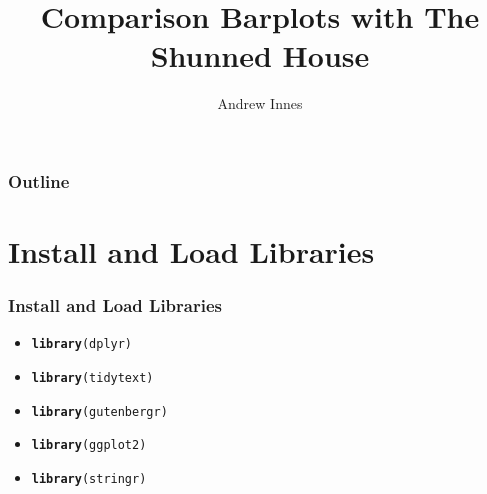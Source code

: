 \documentclass{beamer}\usepackage[]{graphicx}\usepackage[]{color}
\makeatletter
\newcommand{\hlstd}[1]{\textcolor[rgb]{0.345,0.345,0.345}{#1}}%
\newcommand{\hlkwd}[1]{\textcolor[rgb]{0.737,0.353,0.396}{\textbf{#1}}}%
\newenvironment{kframe}{%
 \def\at@end@of@kframe{}%
 \ifinner\ifhmode%
  \def\at@end@of@kframe{\end{minipage}}%
  \begin{minipage}{\columnwidth}%
 \fi\fi%
 \def\FrameCommand##1{\hskip\@totalleftmargin \hskip-\fboxsep
 \colorbox{shadecolor}{##1}\hskip-\fboxsep
     \hskip-\linewidth \hskip-\@totalleftmargin \hskip\columnwidth}%
 \MakeFramed {\advance\hsize-\width
   \@totalleftmargin\z@ \linewidth\hsize
   \@setminipage}}%
 {\par\unskip\endMakeFramed%
 \at@end@of@kframe}
\newenvironment{knitrout}{}{} %
\makeatother
\begin{document}
\title{Comparison Barplots with The Shunned House}
\author{Andrew Innes}

\begin{frame}
  \titlepage
\end{frame}

\begin{frame}
  \frametitle{Outline}
    \tableofcontents
\end{frame}

\section{Install and Load Libraries}
\begin{frame}[fragile]
  \frametitle{Install and Load Libraries}
    \begin{itemize}
      \item<1->
\begin{knitrout}
\color{fgcolor}\begin{kframe}
\begin{alltt}
\hlkwd{library}\hlstd{(dplyr)}
\end{alltt}
\end{kframe}
\end{knitrout}
      \item<2->
\begin{knitrout}
\color{fgcolor}\begin{kframe}
\begin{alltt}
\hlkwd{library}\hlstd{(tidytext)}
\end{alltt}
\end{kframe}
\end{knitrout}
      \item<3->
\begin{knitrout}
\color{fgcolor}\begin{kframe}
\begin{alltt}
\hlkwd{library}\hlstd{(gutenbergr)}
\end{alltt}
\end{kframe}
\end{knitrout}
      \item<4->
\begin{knitrout}
\color{fgcolor}\begin{kframe}
\begin{alltt}
\hlkwd{library}\hlstd{(ggplot2)}
\end{alltt}
\end{kframe}
\end{knitrout}
      \item<5->
\begin{knitrout}
\color{fgcolor}\begin{kframe}
\begin{alltt}
\hlkwd{library}\hlstd{(stringr)}
\end{alltt}
\end{kframe}
\end{knitrout}
    \end{itemize}
\end{frame}
      
\end{document}
